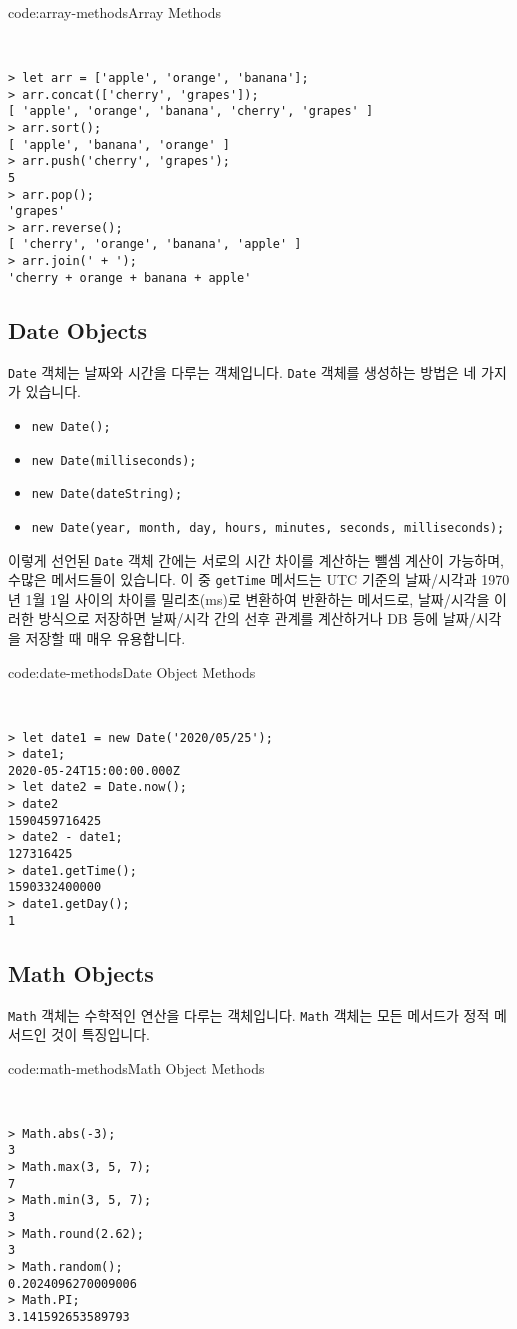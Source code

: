 \begin{codeenv}{code:array-methods}{Array Methods}\begin{verbatim}


> let arr = ['apple', 'orange', 'banana'];
> arr.concat(['cherry', 'grapes']);
[ 'apple', 'orange', 'banana', 'cherry', 'grapes' ]
> arr.sort();
[ 'apple', 'banana', 'orange' ]
> arr.push('cherry', 'grapes');
5
> arr.pop();
'grapes'
> arr.reverse();
[ 'cherry', 'orange', 'banana', 'apple' ]
> arr.join(' + ');
'cherry + orange + banana + apple'
\end{verbatim}
\end{codeenv}

\subsection*{Date Objects}

\verb|Date| 객체는 날짜와 시간을 다루는 객체입니다. \verb|Date| 객체를 생성하는 방법은 네 가지가 있습니다.

\begin{itemize}
    \item \verb|new Date();|
    \item \verb|new Date(milliseconds);|
    \item \verb|new Date(dateString);|
    \item \verb|new Date(year, month, day, hours, minutes, seconds, milliseconds);|
\end{itemize}

이렇게 선언된 \verb|Date| 객체 간에는 서로의 시간 차이를 계산하는 뺄셈 계산이 가능하며, 수많은 메서드들이 있습니다. 이 중 \verb|getTime| 메서드는 UTC 기준의 날짜/시각과 1970년 1월 1일 사이의 차이를 밀리초(ms)로 변환하여 반환하는 메서드로, 날짜/시각을 이러한 방식으로 저장하면 날짜/시각 간의 선후 관계를 계산하거나 DB 등에 날짜/시각을 저장할 때 매우 유용합니다. 

\begin{codeenv}{code:date-methods}{Date Object Methods}\begin{verbatim}


> let date1 = new Date('2020/05/25');
> date1;
2020-05-24T15:00:00.000Z
> let date2 = Date.now();
> date2
1590459716425
> date2 - date1;
127316425
> date1.getTime();
1590332400000
> date1.getDay();
1
\end{verbatim}
\end{codeenv}

\subsection*{Math Objects}

\verb|Math| 객체는 수학적인 연산을 다루는 객체입니다. \verb|Math| 객체는 모든 메서드가 정적 메서드인 것이 특징입니다. 

\begin{codeenv}{code:math-methods}{Math Object Methods}\begin{verbatim}


> Math.abs(-3);
3
> Math.max(3, 5, 7);
7
> Math.min(3, 5, 7);
3
> Math.round(2.62);
3
> Math.random();
0.2024096270009006
> Math.PI;
3.141592653589793
\end{verbatim}
\end{codeenv}
